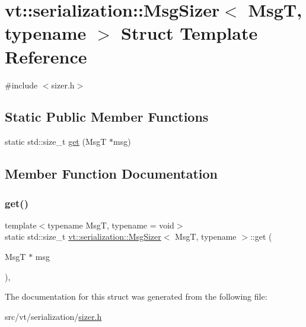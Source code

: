 \hypertarget{structvt_1_1serialization_1_1_msg_sizer}{}\section{vt\+:\+:serialization\+:\+:Msg\+Sizer$<$ MsgT, typename $>$ Struct Template Reference}
\label{structvt_1_1serialization_1_1_msg_sizer}


{\ttfamily \#include $<$sizer.\+h$>$}

\subsection*{Static Public Member Functions}
\begin{DoxyCompactItemize}
\item 
static std\+::size\+\_\+t \hyperlink{structvt_1_1serialization_1_1_msg_sizer_a22f440a462f8874a6661cb900d8d1d38}{get} (MsgT $\ast$msg)
\end{DoxyCompactItemize}


\subsection{Member Function Documentation}
\mbox{\label{structvt_1_1serialization_1_1_msg_sizer_a22f440a462f8874a6661cb900d8d1d38}} 
\subsubsection{\texorpdfstring{get()}{get()}}
{\footnotesize\ttfamily template$<$typename MsgT, typename  = void$>$ \\
static std\+::size\+\_\+t \hyperlink{structvt_1_1serialization_1_1_msg_sizer}{vt\+::serialization\+::\+Msg\+Sizer}$<$ MsgT, typename $>$\+::get (\begin{DoxyParamCaption}\item[{MsgT $\ast$}]{msg }\end{DoxyParamCaption})\hspace{0.3cm}{\ttfamily [inline]}, {\ttfamily [static]}}



The documentation for this struct was generated from the following file\+:\begin{DoxyCompactItemize}
\item 
src/vt/serialization/\hyperlink{src_2vt_2serialization_2sizer_8h}{sizer.\+h}\end{DoxyCompactItemize}
